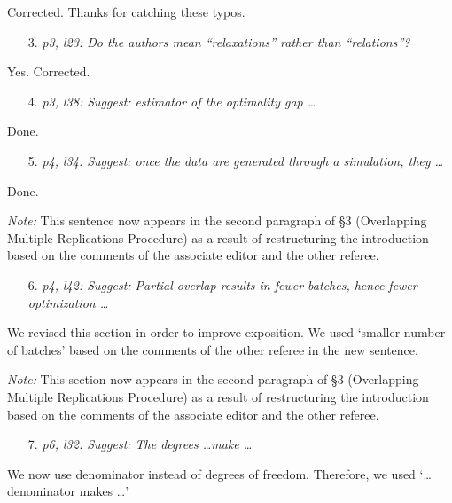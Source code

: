 \documentclass[11pt,notitlepage,onecolumn]{article}
\newcommand{\noi}{\noindent}
\begin{document}
\noindent 
Corrected. Thanks for catching these typos.
\medskip 


\begin{itemize}
\item[3.] \textit{p3, l23: Do the authors mean ``relaxations'' rather than ``relations''?}
\end{itemize}

\noindent 
Yes. Corrected. 
\medskip 


\begin{itemize}
\item[4.] \textit{p3, l38: Suggest: estimator of the optimality gap \ldots}
\end{itemize}

\noindent 
Done.
\medskip 


\begin{itemize}
\item[5.] \textit{p4, l34: Suggest: once the data are generated through a simulation, they \ldots}
\end{itemize}

\noindent 
Done. 
\smallskip 

\noi 
{\it Note:} This sentence now appears in the second paragraph of \S 3 (Overlapping Multiple Replications Procedure) as a result of restructuring the introduction based on the comments of the associate editor and the other referee. 
\medskip 


\begin{itemize}
\item[6.] \textit{p4, l42: Suggest: Partial overlap results in fewer batches, hence fewer optimization \ldots}
\end{itemize}

\noindent 
We revised this section in order to improve exposition. 
We used `smaller number of batches' based on the comments of the other referee in the new sentence. 
\medskip 

\noi 
{\it Note:} This section now appears in the second paragraph of \S 3 (Overlapping Multiple Replications Procedure) as a result of restructuring the introduction based on the comments of the associate editor and the other referee. 
\medskip 


\begin{itemize}
\item[7.] \textit{p6, l32: Suggest: The degrees \ldots make \ldots}
\end{itemize}

\noindent 
We now use denominator instead of degrees of freedom. 
Therefore, we used `\ldots denominator makes \ldots '
\medskip 
\end{document}
